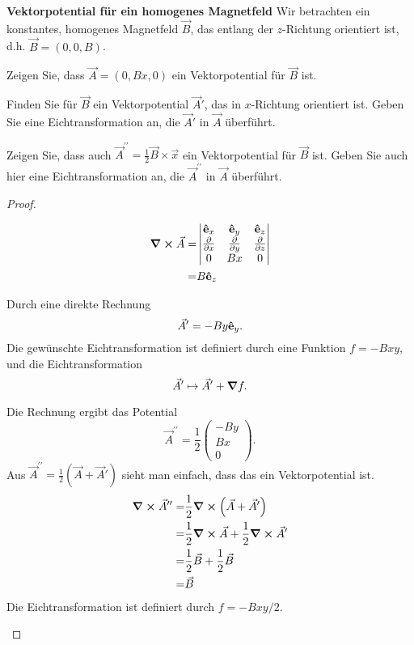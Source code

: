 \begin{Problem}
	\textbf{Vektorpotential für ein homogenes Magnetfeld} Wir betrachten ein konstantes, homogenes Magnetfeld $\vec{B}$, das entlang der $z$-Richtung orientiert ist, d.h. $\vec{B} = (0, 0, B)$.
	\begin{parts}
	\item  Zeigen Sie, dass $\vec{A} = (0, Bx, 0)$ ein Vektorpotential für $\vec{B}$ ist.
	\item Finden Sie für $\vec{B}$ ein Vektorpotential $\vec{A}'$, das in $x$-Richtung orientiert ist. Geben Sie eine Eichtransformation an, die $\vec{A}'$ in $\vec{A}$ überführt.
	\item  Zeigen Sie, dass auch $\vec{A}^{\prime\prime} =\frac{1}{2}\vec{B}\times \vec{x}$ ein Vektorpotential für $\vec{B}$ ist. Geben Sie auch hier eine Eichtransformation an, die $\vec{A}^{\prime\prime}$ in $\vec{A}$ überführt.	
	\end{parts}
\end{Problem}

\begin{proof}
\begin{parts}
\item 
	\begin{align*}
		\curl{\vec{A}}=&\begin{vmatrix}
			\vu{e}_x & \vu{e}_y & \vu{e}_z\\
			\pdv{x} & \pdv{y} & \pdv{z}\\
			0 & Bx & 0
		\end{vmatrix}\\
		=&B\vu{e}_z
	\end{align*}
\item Durch eine direkte Rechnung
	\[
	\vec{A}'= -By\vu{e}_y
	.\] 
	Die gewünschte Eichtransformation ist definiert durch eine Funktion $f=-Bxy$, und die Eichtransformation
	\[
	\vec{A}'\mapsto \vec{A}' + \grad{f}
	.\] 
\item Die Rechnung ergibt das Potential
	\[
	\vec{A}^{\prime\prime}=\frac{1}{2}\begin{pmatrix} -By \\ Bx\\0 \end{pmatrix} 
	.\] 
	Aus $\vec{A}^{\prime\prime}=\frac{1}{2}(\vec{A}+\vec{A}')$ sieht man einfach, dass das ein Vektorpotential ist.
	\begin{align*}
		\curl{\vec{A}^{\prime\prime}}=&\frac{1}{2}\curl{\left( \vec{A}+\vec{A}' \right)}\\
		=&\frac{1}{2}\curl{\vec{A}}+\frac{1}{2}\curl{\vec{A}'}\\
		=&\frac{1}{2}\vec{B}+\frac{1}{2}\vec{B}\\
		=&\vec{B}
	\end{align*}
	Die Eichtransformation ist definiert durch $f=-Bxy / 2$.\qedhere 
\end{parts}	
\end{proof}
